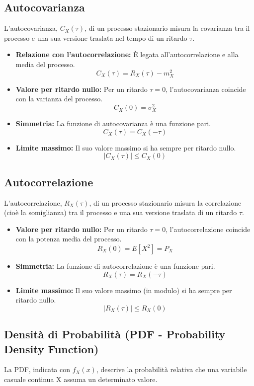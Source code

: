 \subsection{Autocovarianza}
L'autocovarianza, $C_X(\tau)$, di un processo stazionario misura la covarianza tra il processo e una sua versione traslata nel tempo di un ritardo $\tau$.

\begin{itemize}
    \item \textbf{Relazione con l'autocorrelazione:} È legata all'autocorrelazione e alla media del processo.
    $$ C_X(\tau) = R_X(\tau) - m_X^2 $$
    
    \item \textbf{Valore per ritardo nullo:} Per un ritardo $\tau = 0$, l'autocovarianza coincide con la varianza del processo.
    $$ C_X(0) = \sigma_X^2 $$
    
    \item \textbf{Simmetria:} La funzione di autocovarianza è una funzione pari.
    $$ C_X(\tau) = C_X(-\tau) $$
    
    \item \textbf{Limite massimo:} Il suo valore massimo si ha sempre per ritardo nullo.
    $$ |C_X(\tau)| \le C_X(0) $$
\end{itemize}


\subsection{Autocorrelazione}
L'autocorrelazione, $R_X(\tau)$, di un processo stazionario misura la correlazione (cioè la somiglianza) tra il processo e una sua versione traslata di un ritardo $\tau$.

\begin{itemize}
    \item \textbf{Valore per ritardo nullo:} Per un ritardo $\tau = 0$, l'autocorrelazione coincide con la potenza media del processo.
    $$ R_X(0) = E[X^2] = P_X $$
    
    \item \textbf{Simmetria:} La funzione di autocorrelazione è una funzione pari.
    $$ R_X(\tau) = R_X(-\tau) $$
    
    \item \textbf{Limite massimo:} Il suo valore massimo (in modulo) si ha sempre per ritardo nullo.
    $$ |R_X(\tau)| \le R_X(0) $$
\end{itemize}


\subsection{Densità di Probabilità (PDF - Probability Density Function)}
La PDF, indicata con $f_X(x)$, descrive la probabilità relativa che una variabile casuale continua X assuma un determinato valore.

